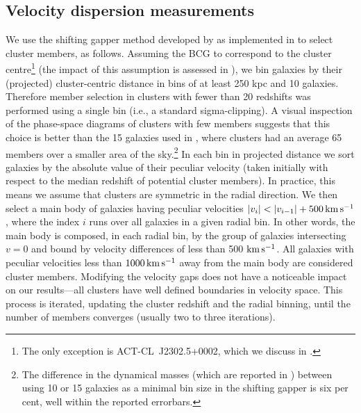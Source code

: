 \subsection{Velocity dispersion measurements}
\label{s:vdisp}

We use the shifting gapper method developed by \cite{fadda96} as implemented in \cite{sifon13} to select cluster members, as follows. Assuming the BCG to correspond to the cluster centre\footnote{The only exception is ACT-CL~J2302.5+0002, which we discuss in .} (the impact of this assumption is assessed in ), we bin galaxies by their (projected) cluster-centric distance in bins of at least 250 kpc and 10 galaxies. Therefore member selection in clusters with fewer than 20 redshifts was performed using a single bin (i.e., a standard sigma-clipping). A visual inspection of the phase-space diagrams of clusters with few members suggests that this choice is better than the 15 galaxies used in \cite{sifon13}, where clusters had an average 65 members over a smaller area of the sky.\footnote{The difference in the dynamical masses (which are reported in ) between using 10 or 15 galaxies as a minimal bin size in the shifting gapper is six per cent, well within the reported errorbars.} In each bin in projected distance we sort galaxies by the absolute value of their peculiar velocity (taken initially with respect to the median redshift of potential cluster members). In practice, this means we assume that clusters are symmetric in the radial direction. We then select a main body of galaxies having peculiar velocities $\lvert v_i \rvert < \lvert v_{i-1} \rvert +500\,\mathrm{km\,s^{-1}}$, where the index $i$ runs over all galaxies in a given radial bin. In other words, the main body is composed, in each radial bin, by the group of galaxies intersecting $v=0$ and bound by velocity differences of less than 500 $\mathrm{km\,s^{-1}}$. All galaxies with peculiar velocities less than $1000\,\mathrm{km\,s^{-1}}$ away from the main body are considered cluster members. Modifying the velocity gaps does not have a noticeable impact on our results---all clusters have well defined boundaries in velocity space. This process is iterated, updating the cluster redshift and the radial binning, until the number of members converges (usually two to three iterations).

